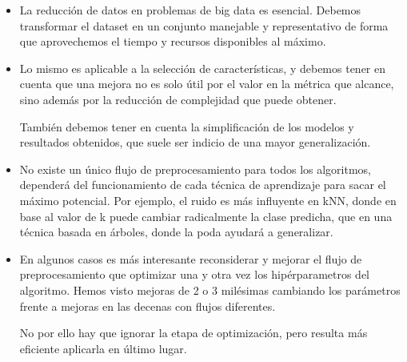 \begin{itemize}
    \item La reducción de datos en problemas de big data es esencial. Debemos transformar el dataset en un conjunto manejable y representativo de forma que aprovechemos el tiempo y recursos disponibles al máximo.
    \item Lo mismo es aplicable a la selección de características, y debemos tener en cuenta que una mejora no es solo útil por el valor en la métrica que alcance, sino además por la reducción de complejidad que puede obtener. 

    También debemos tener en cuenta la simplificación de los modelos y resultados obtenidos, que suele ser indicio de una mayor generalización.

    \item No existe un único flujo de preprocesamiento para todos los algoritmos, dependerá del funcionamiento de cada técnica de aprendizaje para sacar el máximo potencial. Por ejemplo, el ruido es más influyente en kNN, donde en base al valor de k puede cambiar radicalmente la clase predicha, que en una técnica basada en árboles, donde la poda ayudará a generalizar.
    \item En algunos casos es más interesante reconsiderar y mejorar el flujo de preprocesamiento que optimizar una y otra vez los hipérparametros del algoritmo. Hemos visto mejoras de 2 o 3 milésimas cambiando los parámetros frente a mejoras en las decenas con flujos diferentes.
    
    No por ello hay que ignorar la etapa de optimización, pero resulta más eficiente aplicarla en último lugar.
\end{itemize}